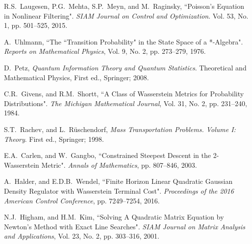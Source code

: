 \documentclass[letterpaper,10pt,twocolumn,conference]{ieeeconf}
\begin{document}
\begin{thebibliography}{99}
R.S.~Laugesen, P.G.~Mehta, S.P.~Meyn, and M.~Raginsky, ``Poisson's Equation in Nonlinear Filtering". \emph{SIAM Journal on Control and Optimization}. Vol. 53, No. 1, pp. 501--525, 2015.





A.~Uhlmann, ``The ``Transition Probability" in the State Space of a *-Algebra". \emph{Reports on Mathematical Physics}, Vol. 9, No. 2, pp. 273--279, 1976.

D.~Petz, \emph{Quantum Information Theory and Quantum Statistics}. Theoretical and Mathematical Physics, First ed., Springer; 2008.


C.R.~Givens, and R.M.~Shortt, ``A Class of Wasserstein Metrics for Probability Distributions". \emph{The Michigan Mathematical Journal}, Vol. 31, No. 2, pp. 231--240, 1984.


S.T.~Rachev, and L.~R{\"u}schendorf, \emph{Mass Transportation Problems. Volume I: Theory}. First ed., Springer; 1998.


E.A.~Carlen, and W.~Gangbo, ``Constrained Steepest Descent in the 2-Wasserstein Metric". \emph{Annals of Mathematics}, pp. 807--846, 2003.


A.~Halder, and E.D.B.~Wendel, ``Finite Horizon Linear Quadratic Gaussian Density Regulator with Wasserstein Terminal Cost". \emph{Proceedings of the 2016 American Control Conference}, pp. 7249--7254, 2016.




N.J.~Higham, and H.M.~Kim, ``Solving A Quadratic Matrix Equation by Newton's Method with Exact Line Searches". \emph{SIAM Journal on Matrix Analysis and Applications}, Vol. 23, No. 2, pp. 303--316, 2001.



\end{thebibliography}
\end{document}
